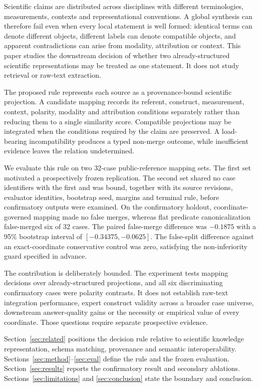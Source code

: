 Scientific claims are distributed across disciplines with different
terminologies, measurements, contexts and representational conventions. A
global synthesis can therefore fail even when every local statement is well
formed: identical terms can denote different objects, different labels can
denote compatible objects, and apparent contradictions can arise from
modality, attribution or context. This paper studies the downstream decision
of whether two already-structured scientific representations may be treated as
one statement. It does not study retrieval or raw-text extraction.

The proposed rule represents each source as a provenance-bound scientific
projection. A candidate mapping records its referent, construct, measurement,
context, polarity, modality and attribution conditions separately rather than
reducing them to a single similarity score. Compatible projections may be
integrated when the conditions required by the claim are preserved. A
load-bearing incompatibility produces a typed non-merge outcome, while
insufficient evidence leaves the relation undetermined.

We evaluate this rule on two 32-case public-reference mapping sets. The first
set motivated a prospectively frozen replication. The second set shared no case
identifiers with the first and was bound, together with its source revisions, evaluator
identities, bootstrap seed, margins and terminal rule, before confirmatory
outputs were examined. On the confirmatory holdout, coordinate-governed mapping
made no false merges, whereas flat predicate canonicalization false-merged six
of 32 cases. The paired false-merge difference was $-0.1875$ with a 95\%
bootstrap interval of $[-0.34375,-0.0625]$. The false-split difference against
an exact-coordinate conservative control was zero, satisfying the
non-inferiority guard specified in advance.

The contribution is deliberately bounded. The experiment tests mapping
decisions over already-structured projections, and all six discriminating
confirmatory cases were polarity contrasts. It
does not establish raw-text integration performance, expert construct validity
across a broader case universe, downstream answer-quality gains or the
necessity or empirical value of every coordinate. Those questions require separate prospective
evidence.

Section~\ref{sec:related} positions the decision rule relative to scientific
knowledge representation, schema matching, provenance and semantic
interoperability. Sections~\ref{sec:method}--\ref{sec:eval} define the rule and
the frozen evaluation. Section~\ref{sec:results} reports the confirmatory result
and secondary ablations. Sections~\ref{sec:limitations} and
\ref{sec:conclusion} state the boundary and conclusion.
\endinput
